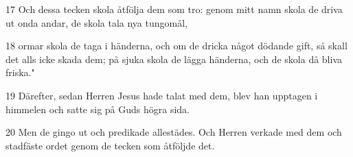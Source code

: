 \par 17 Och dessa tecken skola åtfölja dem som tro: genom mitt namn skola de driva ut onda andar, de skola tala nya tungomål,
\par 18 ormar skola de taga i händerna, och om de dricka något dödande gift, så skall det alls icke skada dem; på sjuka skola de lägga händerna, och de skola då bliva friska."
\par 19 Därefter, sedan Herren Jesus hade talat med dem, blev han upptagen i himmelen och satte sig på Guds högra sida.
\par 20 Men de gingo ut och predikade allestädes. Och Herren verkade med dem och stadfäste ordet genom de tecken som åtföljde det.


